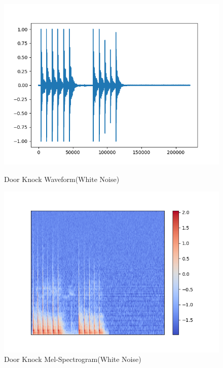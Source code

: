 \begin{figure}[H]
\begin{minipage}[t]{0.5\textwidth}
\centering
\includegraphics[width=\textwidth]{./graph/door_wood_knock_WhiteNoise_wave.png} 
\caption{Door Knock Waveform(White Noise)}
\label{WHwave}
\end{minipage}
\begin{minipage}[t]{0.5\textwidth}
\centering
\includegraphics[width=\textwidth]{./graph/door_wood_knock_WhiteNoise_melsp.png} 
\caption{Door Knock Mel-Spectrogram(White Noise)}
\label{WHsp}
\end{minipage}
\end{figure}

